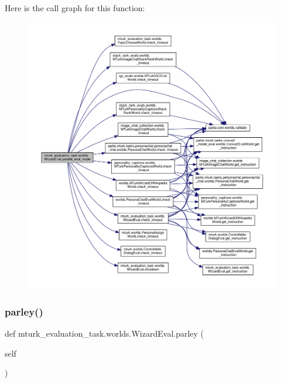 Here is the call graph for this function\+:
\nopagebreak
\begin{figure}[H]
\begin{center}
\leavevmode
\includegraphics[width=350pt]{classmturk__evaluation__task_1_1worlds_1_1WizardEval_a63d88c9aa26eb8886eb2928d920017cb_cgraph}
\end{center}
\end{figure}
\mbox{\label{classmturk__evaluation__task_1_1worlds_1_1WizardEval_a8c2713a39b3a8e89bec417c2b6c0c1eb}} 
\subsubsection{\texorpdfstring{parley()}{parley()}}
{\footnotesize\ttfamily def mturk\+\_\+evaluation\+\_\+task.\+worlds.\+Wizard\+Eval.\+parley (\begin{DoxyParamCaption}\item[{}]{self }\end{DoxyParamCaption})}



